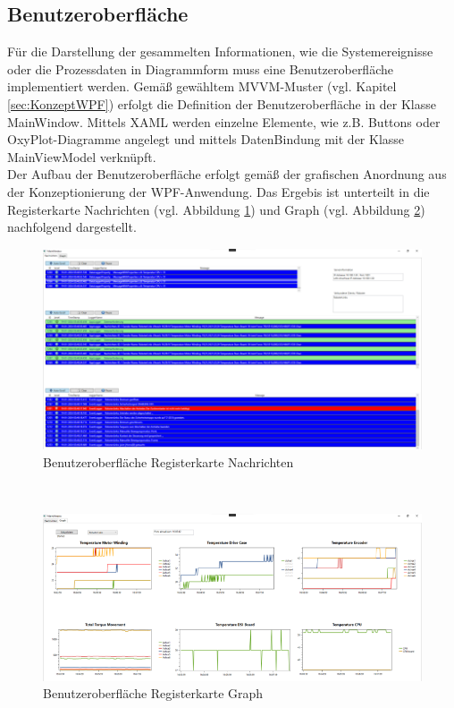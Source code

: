 \documentclass[ a4paper,
                oneside,
                toc=bibliography,
                toc=listof
                ]{scrbook}
\begin{document}
   	\subsection{Benutzeroberfläche}
   	Für die Darstellung der gesammelten Informationen, wie die Systemereignisse oder die Prozessdaten in Diagrammform muss eine Benutzeroberfläche implementiert werden. Gemäß gewähltem MVVM-Muster (vgl. Kapitel \ref{sec:KonzeptWPF}) erfolgt die Definition der Benutzeroberfläche in der Klasse MainWindow. Mittels XAML werden einzelne Elemente, wie z.B. Buttons oder OxyPlot-Diagramme angelegt und mittels DatenBindung mit der Klasse MainViewModel verknüpft.\\
   	Der Aufbau der Benutzeroberfläche erfolgt gemäß der grafischen Anordnung aus der Konzeptionierung der WPF-Anwendung. Das Ergebis ist unterteilt in die Registerkarte \glqq Nachrichten\grqq{} (vgl. Abbildung \ref{fig:TabLogger}) und \glqq Graph\grqq{} (vgl. Abbildung \ref{fig:TabGraph}) nachfolgend dargestellt.\\
   	\begin{figure}[!ht]
   		\centering
   		\includegraphics[width=1\linewidth]{./images/TabLogger.png}
   		\caption{Benutzeroberfläche Registerkarte Nachrichten}
   		\label{fig:TabLogger}
   	\end{figure}\\
   	\begin{figure}[!ht]
   	\centering
   	\includegraphics[width=1\linewidth]{./images/TabPlot.png}
   	\caption{Benutzeroberfläche Registerkarte Graph}
   	\label{fig:TabGraph}
   	\end{figure}\\
\end{document}
